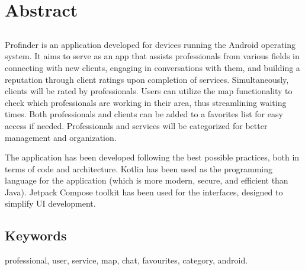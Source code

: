\chapter*{Abstract}

\section*{\tituloPortadaEngVal}

Profinder is an application developed for devices running the Android operating system. It aims to serve as an app that assists professionals from various fields in connecting with new clients, engaging in conversations with them, and building a reputation through client ratings upon completion of services. Simultaneously, clients will be rated by professionals. Users can utilize the map functionality to check which professionals are working in their area, thus streamlining waiting times. Both professionals and clients can be added to a favorites list for easy access if needed. Professionals and services will be categorized for better management and organization.

The application has been developed following the best possible practices, both in terms of code and architecture. Kotlin has been used as the programming language for the application (which is more modern, secure, and efficient than Java). Jetpack Compose toolkit has been used for the interfaces, designed to simplify UI development.


\section*{Keywords}
\noindent professional, user, service, map, chat, favourites, category, android.



